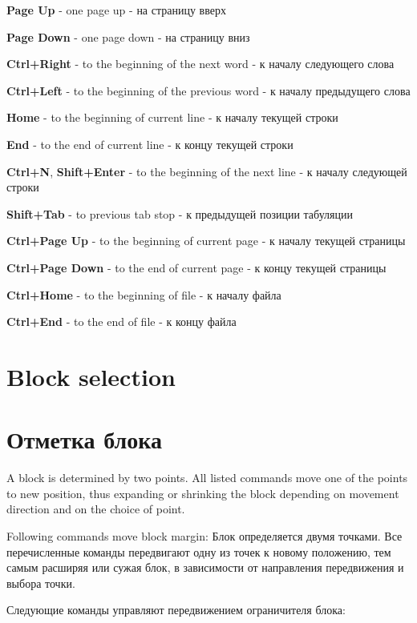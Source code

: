 {\bf Page Up} 
\ifenglish
- one page up
\else
- на страницу вверх
\fi

{\bf Page Down} 
\ifenglish
- one page down
\else
- на страницу вниз
\fi

{\bf Ctrl+Right} 
\ifenglish
- to the beginning of the next word
\else
- к началу следующего слова
\fi

{\bf Ctrl+Left} 
\ifenglish
- to the beginning of the previous word
\else
- к началу предыдущего слова
\fi

{\bf Home} 
\ifenglish
- to the beginning of current line
\else
- к началу текущей строки
\fi

{\bf End} 
\ifenglish
- to the end of current line
\else
- к концу текущей строки
\fi

{\bf Ctrl+N}, {\bf Shift+Enter} 
\ifenglish
- to the beginning of the next line
\else
- к началу следующей строки
\fi

{\bf Shift+Tab} 
\ifenglish
- to previous tab stop
\else
- к предыдущей позиции табуляции
\fi

{\bf Ctrl+Page Up} 
\ifenglish
- to the beginning of current page
\else
- к началу текущей страницы
\fi

{\bf Ctrl+Page Down} 
\ifenglish
- to the end of current page
\else
- к концу текущей страницы
\fi

{\bf Ctrl+Home} 
\ifenglish
- to the beginning of file
\else
- к началу файла
\fi

{\bf Ctrl+End} 
\ifenglish
- to the end of file
\else
- к концу файла
\fi

\ifenglish
\section{Block selection}
\else
\section{Отметка блока}
\fi
{}

\ifenglish
A block is determined by two points. All listed commands move one of the points
to new position, thus expanding or shrinking the block depending on movement
direction and on the choice of point.

Following commands move block margin:
\else
Блок определяется двумя точками. Все перечисленные команды передвигают одну из
точек к новому положению, тем самым расширяя или сужая блок, в зависимости от
направления передвижения и выбора точки.

Следующие команды управляют передвижением ограничителя блока:
\fi

